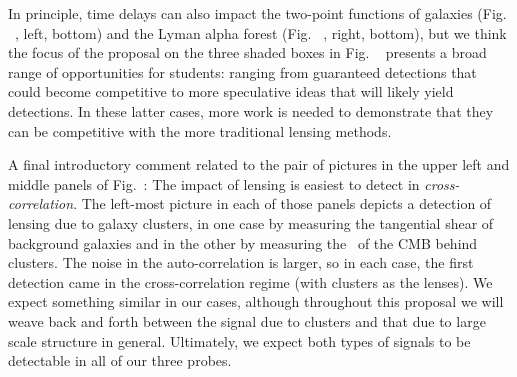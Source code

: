  In principle, time delays can also impact the
  two-point functions of galaxies (Fig. ~, left, bottom) and 
the Lyman alpha
  forest (Fig. ~, right, bottom), but we think 
the focus of the
  proposal on the three shaded boxes in Fig. ~
 presents a broad range of
  opportunities for students: ranging from guaranteed detections that
  could become competitive to more speculative ideas that will likely
  yield detections. In these latter cases, more work is needed to
 demonstrate that they
  can be competitive with the more traditional
  lensing methods.

A final introductory comment related to the pair of pictures in the
upper left and middle panels of Fig.~: The impact of lensing
is easiest to detect in {\it cross-correlation}. The left-most picture
in each of those panels depicts a detection of lensing due to galaxy
clusters, in one case by measuring the tangential shear of background
galaxies and in the other by measuring the \atf\ of the CMB behind
clusters. The noise in the auto-correlation is larger, so in each
case, the first detection came in the cross-correlation regime (with
clusters as the lenses). We expect something similar in our cases,
although throughout this proposal we will weave back and forth between
the signal due to clusters and that due to large scale structure in
general. Ultimately, we expect both types of signals to be detectable
in all of our three probes.

